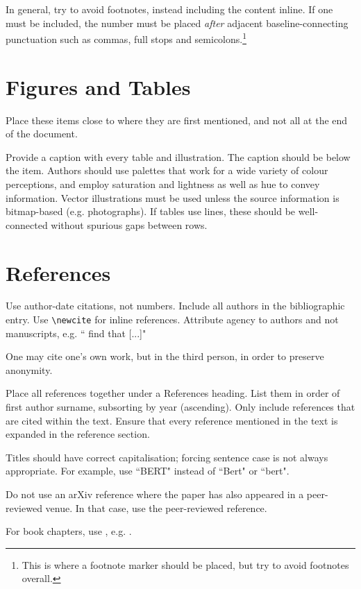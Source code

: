 \documentclass{article}
\begin{document}
In general, try to avoid footnotes, instead including the content inline. If one must be included, the number must be placed \emph{after} adjacent baseline-connecting punctuation such as commas, full stops and semicolons.\footnote{This is where a footnote marker should be placed, but try to avoid footnotes overall.}

\section{Figures and Tables}

Place these items close to where they are first mentioned, and not all at the end of the document. 

Provide a caption with every table and illustration. The caption should be below the item. Authors should use palettes that work for a wide variety of colour perceptions, and employ saturation and lightness as well as hue to convey information. Vector illustrations must be used unless the source information is bitmap-based (e.g. photographs). If tables use lines, these should be well-connected without spurious gaps between rows.

\section{References}

Use author-date citations, not numbers. Include all authors in the bibliographic entry. Use {\tt {\textbackslash}newcite} for inline references. Attribute agency to authors and not manuscripts, e.g. `` find that [...]"

One may cite one's own work, but in the third person, in order to preserve anonymity.

Place all references together under a References heading. List them in order of first author surname, subsorting by year (ascending). Only include references that are cited within the text. Ensure that every reference mentioned in the text is expanded in the reference section.

Titles should have correct capitalisation; forcing sentence case is not always appropriate. For example, use ``BERT" instead of ``Bert" or ``bert".

Do not use an arXiv reference where the paper has also appeared in a peer-reviewed venue. In that case, use the peer-reviewed reference.

For book chapters, use \texttt{\@inbook}, e.g. \citet{swift}.
\end{document}
